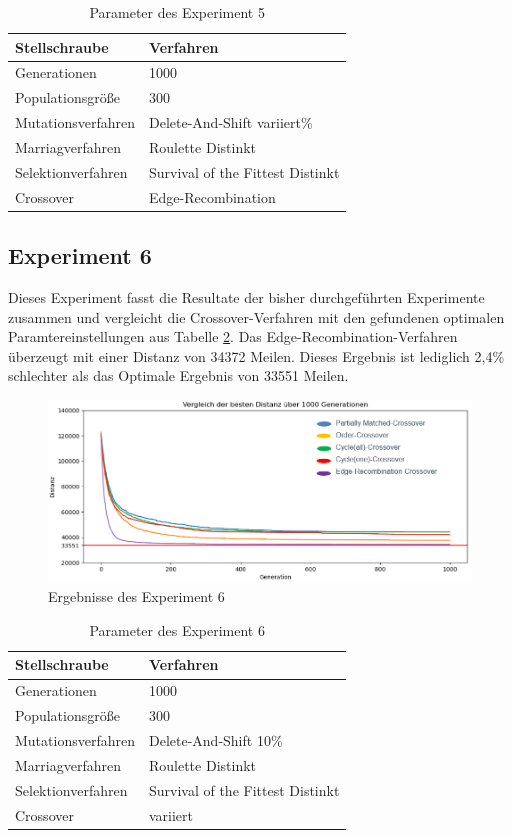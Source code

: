 \begin{table}[H]
\centering
\caption{Parameter des Experiment 5}
\begin{tabular}{ll}
Stellschraube & Verfahren \\
\hline
Generationen & 1000 \\
Populationsgröße & 300 \\
Mutationsverfahren & Delete-And-Shift variiert\% \\
Marriagverfahren & Roulette Distinkt \\
Selektionverfahren & Survival of the Fittest Distinkt \\
Crossover & Edge-Recombination
\end{tabular}
\label{tab:e5}
\end{table}

\subsection{Experiment 6}
Dieses Experiment fasst die Resultate der bisher durchgeführten Experimente zusammen und vergleicht die Crossover-Verfahren mit den gefundenen optimalen Paramtereinstellungen aus Tabelle \ref{tab:e6}.
Das Edge-Recombination-Verfahren überzeugt mit einer Distanz von 34372 Meilen. Dieses Ergebnis ist lediglich 2,4\% schlechter als das Optimale Ergebnis von 33551 Meilen. 
\begin{figure}[H]
\centering
\includegraphics[width=1\textwidth]{img/Vortrag/experiment6.png}
\caption{Ergebnisse des Experiment 6}
\label{fig:experiment6}
\end{figure}

\begin{table}[H]
\centering
\caption{Parameter des Experiment 6}
\begin{tabular}{ll}
Stellschraube & Verfahren \\
\hline
Generationen & 1000 \\
Populationsgröße & 300 \\
Mutationsverfahren & Delete-And-Shift 10\% \\
Marriagverfahren & Roulette Distinkt \\
Selektionverfahren & Survival of the Fittest Distinkt \\
Crossover & variiert
\end{tabular}
\label{tab:e6}
\end{table}

